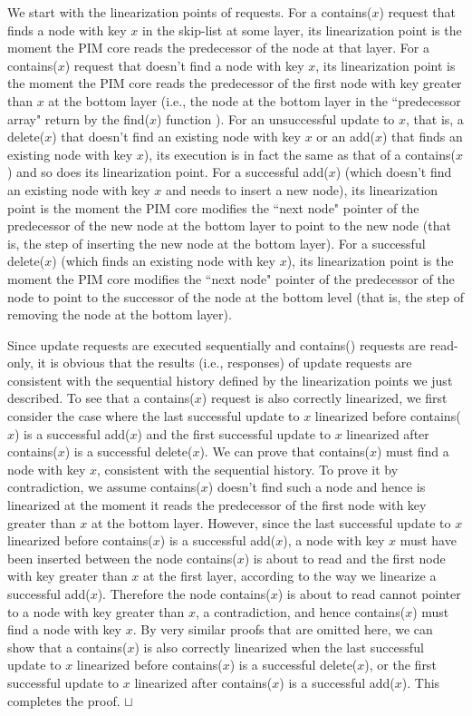 \documentclass[11pt]{article}
\newcommand{\sq}{\hbox{\rlap{$\sqcap$}$\sqcup$}}
\newcommand{\qed}{\hspace*{\fill}\sq}
\begin{document}
We start with the linearization points of requests. 
For a contains($x$) request that finds a node with key $x$ in the skip-list at some layer, 
its linearization point is the moment the PIM core reads the predecessor of the node at that layer. 
For a contains($x$) request that doesn't find a node with key $x$, its linearization point is the moment 
the PIM core reads the predecessor of the first node with key greater than $x$ at the bottom layer 
(i.e., the node at the bottom layer in the ``predecessor array" return by the find($x$) function \cite{Herlihy08}). 
For an unsuccessful update to $x$, that is, a delete($x$) that doesn't find an existing node with key $x$ 
or an add($x$) that finds an existing node with key $x$), 
its execution is in fact the same as that of a contains($x$) and so does its linearization point. 
For a successful add($x$) (which doesn't find an existing node with key $x$ and needs to insert a new node), 
its linearization point is the moment the PIM core modifies the ``next node" pointer of the predecessor 
of the new node at the bottom layer to point to the new node 
(that is, the step of inserting the new node at the bottom layer).  
For a successful delete($x$) (which finds an existing node with key $x$), its linearization point is 
the moment the PIM core modifies the ``next node" pointer of the predecessor of the node to point to 
the successor of the node at the bottom level (that is, the step of removing the node at the bottom layer). 

Since update requests are executed sequentially and contains() requests are read-only, 
it is obvious that the results (i.e., responses) of update requests are consistent 
with the sequential history defined by the linearization points we just described. 
To see that a contains($x$) request is also correctly linearized, we first consider the case where 
the last successful update to $x$ linearized before contains($x$) is a successful add($x$) and 
the first successful update to $x$ linearized after contains($x$) is a successful delete($x$). 
We can prove that contains($x$) must find a node with key $x$, consistent with the sequential history. 
To prove it by contradiction, we assume contains($x$) doesn't find such a node and hence is linearized 
at the moment it reads the predecessor of the first node with key greater than $x$ at the bottom layer. 
However, since the last successful update to $x$ linearized before contains($x$) is a successful add($x$), 
a node with key $x$ must have been inserted between the node contains($x$) is about to read and the first 
node with key greater than $x$ at the first layer, according to the way we linearize a successful add($x$). 
Therefore the node contains($x$) is about to read cannot pointer to a node with key greater than $x$, 
a contradiction, and hence contains($x$) must find a node with key $x$. 
By very similar proofs that are omitted here, we can show that a contains($x$) is also correctly linearized 
when the last successful update to $x$ linearized before contains($x$) is a successful delete($x$), or
the first successful update to $x$ linearized after contains($x$) is a successful add($x$). 
This completes the proof. 
\qed
\end{document}
